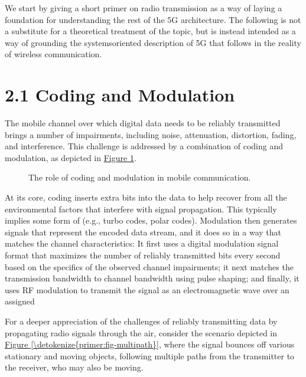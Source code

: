 \documentclass[a4paper,11pt,english]{sphinxmanual}
\let\sphinxpxdimen\pdfpxdimen\else\newdimen\sphinxpxdimen
\begin{document}
\sphinxAtStartPar
We start by giving a short primer on radio transmission as a way of
laying a foundation for understanding the rest of the 5G architecture.
The following is not a substitute for a theoretical treatment of the topic,
but is instead intended as a way of grounding the systems\sphinxhyphen{}oriented
description of 5G that follows in the reality of wireless communication.


\section{2.1 Coding and Modulation}
\label{\detokenize{primer:coding-and-modulation}}
\sphinxAtStartPar
The mobile channel over which digital data needs to be reliably
transmitted brings a number of impairments, including noise,
attenuation, distortion, fading, and interference. This challenge is
addressed by a combination of coding and modulation, as depicted in
\hyperref[\detokenize{primer:fig-modulation}]{Figure \ref{\detokenize{primer:fig-modulation}}}.

\begin{figure}[ht]
\centering
\capstart

\noindent\sphinxincludegraphics[width=500\sphinxpxdimen]{{Slide09}.png}
\caption{The role of coding and modulation in mobile communication.}\label{\detokenize{primer:id5}}\label{\detokenize{primer:fig-modulation}}\end{figure}

\sphinxAtStartPar
At its core, coding inserts extra bits into the data to help recover
from all the environmental factors that interfere with signal
propagation. This typically implies some form of  (e.g., turbo codes, polar codes). Modulation then
generates signals that represent the encoded data stream, and it does
so in a way that matches the channel characteristics: It first uses a
digital modulation signal format that maximizes the number of reliably
transmitted bits every second based on the specifics of the observed
channel impairments; it next matches the transmission
bandwidth to channel bandwidth using pulse shaping; and finally, it
uses RF modulation to transmit the signal as an electromagnetic wave
over an assigned 

\sphinxAtStartPar
For a deeper appreciation of the challenges of reliably transmitting
data by propagating radio signals through the air, consider the
scenario depicted in \hyperref[\detokenize{primer:fig-multipath}]{Figure \ref{\detokenize{primer:fig-multipath}}}, where
the signal bounces off various stationary and moving objects,
following multiple paths from the transmitter to the receiver, who may
also be moving.
\end{document}
